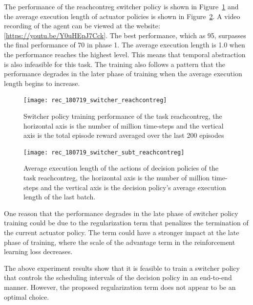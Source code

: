 The performance of the reachcontreg switcher policy is shown in Figure~\ref{rec_switcher_reachcontreg} and the average execution length of actuator policies is shown in Figure~\ref{rec_switcher_subt_reachcontreg}. A video recording of the agent can be viewed at the website:  [\url{https://youtu.be/Y0uHEpJ7Cck}]. The best performance, which as 95, surpasses the final performance of 70 in phase 1. The average execution length is 1.0 when the performance reaches the highest level. This means that temporal abstraction is also infeasible for this task. The training also follows a pattern that the performance degrades in the later phase of training when the average execution length begins to increase.
\begin{figure}[!htbp]
	\centering
	\texttt{[image: rec\_180719\_switcher\_reachcontreg]}
	\caption{Switcher policy training performance of the task reachcontreg, the horizontal axis is the number of million time-steps and the vertical axis is the total episode reward averaged over the last 200 episodes}
	\label{rec_switcher_reachcontreg}
\end{figure}

\begin{figure}[!htbp]
	\centering
	\texttt{[image: rec\_180719\_switcher\_subt\_reachcontreg]}
	\caption{Average execution length of the actions of decision policies of the task reachcontreg, the horizontal axis is the number of million time-steps and the vertical axis is the decision policy's average execution length of the last batch.}
	\label{rec_switcher_subt_reachcontreg}
\end{figure}

One reason that the performance degrades in the late phase of switcher policy training could be due to the regularization term that penalizes the termination of the current actuator policy. The term could have a stronger impact at the late phase of training, where the scale of the advantage term in the reinforcement learning loss decreases.

The above experiment results show that it is feasible to train a switcher policy that controls the scheduling intervals of the decision policy in an end-to-end manner. However, the proposed regularization term does not appear to be an optimal choice. 